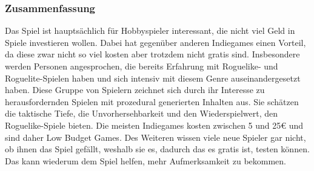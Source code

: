 \subsubsection{Zusammenfassung}\label{subsubsec:Zusammenfassung}
Das Spiel ist hauptsächlich für Hobbyspieler interessant, die nicht viel Geld in Spiele investieren wollen.
Dabei hat \ff gegenüber anderen Indiegames einen Vorteil, da diese zwar nicht so viel kosten aber trotzdem nicht gratis sind.
Insbesondere werden Personen angesprochen, die bereits Erfahrung mit Roguelike- und Roguelite-Spielen haben und sich intensiv mit diesem Genre auseinandergesetzt haben.
Diese Gruppe von Spielern zeichnet sich durch ihr Interesse zu herausfordernden Spielen mit prozedural generierten Inhalten aus.
Sie schätzen die taktische Tiefe, die Unvorhersehbarkeit und den Wiederspielwert, den Roguelike-Spiele bieten.
Die meisten Indiegames kosten zwischen 5 und 25€ und sind daher Low Budget Games.
Des Weiteren wissen viele neue Spieler gar nicht, ob ihnen das Spiel gefällt, weshalb sie es, dadurch das es gratis ist, testen können.
Das kann wiederum dem Spiel helfen, mehr Aufmerksamkeit zu bekommen.


\renewcommand{\kapitelautor}{}
